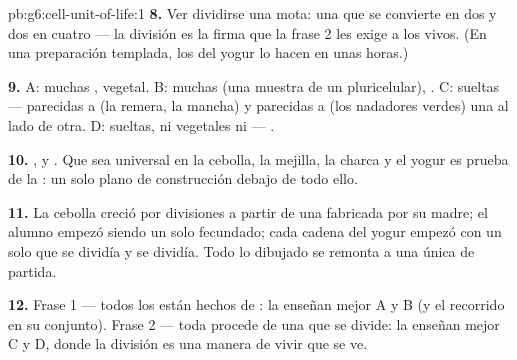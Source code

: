 \begin{solution}{pb:g6:cell-unit-of-life:1}
\textbf{8.} Ver dividirse una mota: una que se convierte en dos y dos
en cuatro --- la división es la firma que la frase 2 les exige a los
vivos. (En una preparación templada, los  del yogur lo hacen
en unas horas.)

\textbf{9.} A: muchas , vegetal. B: muchas  (una muestra
de un  pluricelular), . C:  sueltas --- parecidas a
 (la remera, la mancha) y parecidas a  (los nadadores
verdes) una al lado de otra. D:  sueltas, ni vegetales ni
 --- .

\textbf{10.} ,  y . Que sea universal en la
cebolla, la mejilla, la charca y el yogur es prueba de la : un solo plano de construcción debajo de todo ello.

\textbf{11.} La cebolla creció por divisiones a partir de una 
fabricada por su  madre; el alumno empezó siendo un solo 
fecundado; cada cadena del yogur empezó con un solo  que se
dividía y se dividía. Todo lo dibujado se remonta a una única  de
partida.

\textbf{12.} Frase 1 --- todos los  están hechos de
: la enseñan mejor A y B (y el recorrido en su conjunto). Frase
2 --- toda  procede de una  que se divide: la enseñan mejor
C y D, donde la división es una manera de vivir que se ve.
\end{solution}

